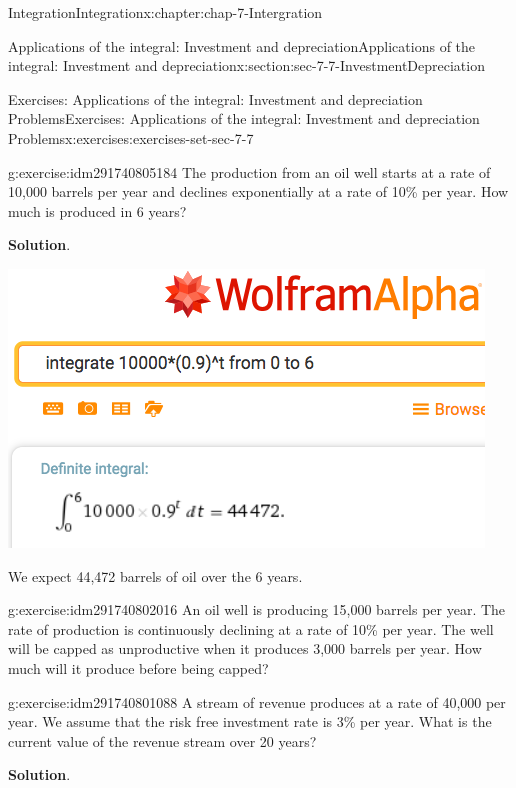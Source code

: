 \documentclass[oneside,10pt,]{book}
\numberwithin{equation}{section}
\begin{document}
\begin{chapterptx}{Integration}{}{Integration}{}{}{x:chapter:chap-7-Intergration}
\begin{sectionptx}{Applications of the integral: Investment and depreciation}{}{Applications of the integral: Investment and depreciation}{}{}{x:section:sec-7-7-InvestmentDepreciation}
\begin{exercises-subsection}{Exercises: Applications of the integral: Investment and depreciation Problems}{}{Exercises: Applications of the integral: Investment and depreciation Problems}{}{}{x:exercises:exercises-set-sec-7-7}
\begin{divisionexercise}{5}{}{}{g:exercise:idm291740805184}
The production from an oil well starts at a rate of 10,000 barrels per year and declines exponentially at a rate of 10\% per year.  How much is produced in 6 years?%
\par\smallskip%
\noindent\textbf{Solution}.\hypertarget{g:solution:idm291740804496}{}\quad{}\begin{sidebyside}{1}{0.1}{0.1}{0}%
\begin{sbspanel}{0.8}%
\includegraphics[width=\linewidth]{images/sec7-7-sol5a.png}
\end{sbspanel}%
\end{sidebyside}%
\par
We expect 44,472 barrels of oil over the 6 years.%
\end{divisionexercise}%
\begin{divisionexercise}{6}{}{}{g:exercise:idm291740802016}%
An oil well is producing 15,000 barrels per year.  The rate of production is continuously declining at a rate of 10\% per year.  The well will be capped as unproductive when it produces 3,000 barrels per year.  How much will it produce before being capped?%
\end{divisionexercise}%
\begin{divisionexercise}{7}{}{}{g:exercise:idm291740801088}%
A stream of revenue produces at a rate of \textdollar{}40,000 per year.  We assume that the risk free investment rate is 3\% per year.  What is the current value of the revenue stream over 20 years?%
\par\smallskip%
\noindent\textbf{Solution}.\hypertarget{g:solution:idm291740800384}{}\quad{}\begin{sidebyside}{1}{0.1}{0.1}{0}%
\begin{sbspanel}{0.8}%

\end{sbspanel}
\end{sidebyside}
\end{divisionexercise}
\end{exercises-subsection}
\end{sectionptx}
\end{chapterptx}
\end{document}

